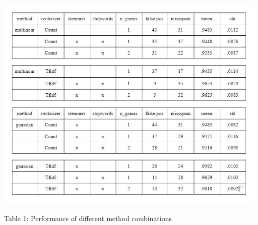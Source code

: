 \documentclass{article}
\begin{document}
\includegraphics[scale=.63]{table1.JPG}
\begin{paragraph}
\usepackage{}{Table 1: Performance of different method combinations}
\end{paragraph}
\end{document}
